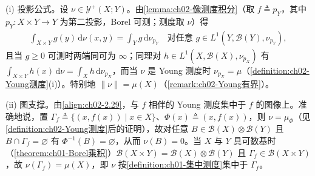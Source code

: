 \documentclass[../../main.tex]{subfiles}%
\begin{document}
\begin{remark}\label{remark:ch02-Young图支撑}\label{remark:ch02-Young投影}
(i) 投影公式。设 $\nu\in\mathcal Y^+(X;Y)$。由\cref{lemma:ch02-像测度积分}（取 $f\triangleq p_Y$，其中 $p_Y:X\times Y\to Y$ 为第二投影，Borel 可测；测度取 $\nu$）得
\begin{align*}
\int_{X\times Y}g(y)\,\mathrm{d}\nu(x,y)=\int_Yg\,\mathrm{d}\nu_{p_Y}\quad\text{对任意 }g\in L^1(Y,\mathscr B(Y),\nu_{p_Y}),
\end{align*}
且当 $g\geqslant0$ 可测时两端同可为 $\infty$；同理对 $h\in L^1(X,\mathscr B(X),\nu_{p_X})$ 有 $\int_{X\times Y}h(x)\,\mathrm{d}\nu=\int_Xh\,\mathrm{d}\nu_{p_X}$，而当 $\nu$ 是 Young 测度时 $\nu_{p_X}=\mu$（\cref{definition:ch02-Young测度}(i)）。特别地 $\|\nu\|=\mu(X)$（\cref{remark:ch02-Young有界}）。

(ii) 图支撑。由\eqref{align:ch02-2.29}，与 $f$ 相伴的 Young 测度集中于 $f$ 的图像上。准确地说，置 $\Gamma_f\triangleq\{(x,f(x))\mid x\in X\}$、$\Phi(x)\triangleq(x,f(x))$，则 $\nu=\mu_\Phi$（见\cref{definition:ch02-Young测度}后的证明），故对任意 $B\in\mathscr B(X)\otimes\mathscr B(Y)$ 且 $B\cap\Gamma_f=\varnothing$ 有 $\Phi^{-1}(B)=\varnothing$，从而 $\nu(B)=0$。当 $X$ 与 $Y$ 具可数基时（\cref{theorem:ch01-Borel乘积}）$\mathscr B(X\times Y)=\mathscr B(X)\otimes\mathscr B(Y)$ 且 $\Gamma_f\in\mathscr B(X\times Y)$，故 $\nu(\Gamma_f)=\mu(X)$，即 $\nu$ 按\cref{definition:ch01-集中测度}集中于 $\Gamma_f$。


\end{remark}
\end{document}
